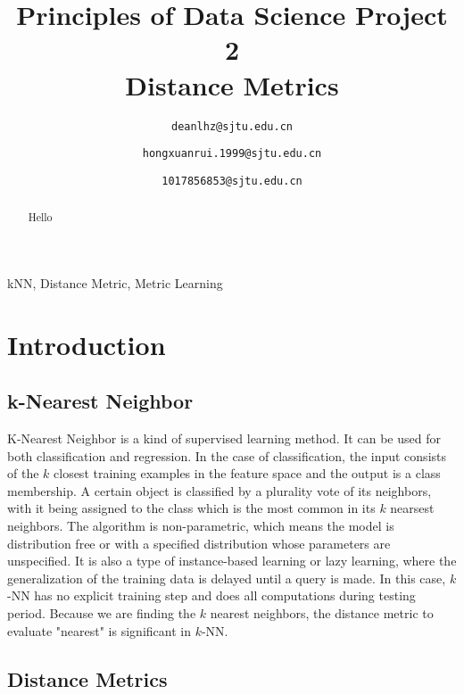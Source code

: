 \documentclass[conference]{IEEEtran}
\begin{document}


\title{Principles of Data Science Project 2\\
Distance Metrics}

\author{
\texttt{deanlhz@sjtu.edu.cn}
\and
{}
\texttt{hongxuanrui.1999@sjtu.edu.cn}
\and
{}
\texttt{1017856853@sjtu.edu.cn}
}

\maketitle

\begin{abstract}
Hello
\end{abstract}

\begin{IEEEkeywords}
kNN, Distance Metric, Metric Learning
\end{IEEEkeywords}

\section{Introduction}
\subsection{k-Nearest Neighbor}
K-Nearest Neighbor is a kind of supervised learning method. It can be used for both classification and regression.
In the case of classification, the input consists of the $k$ closest training examples in the feature space and the output is a class membership.
A certain object is classified by a plurality vote of its neighbors, with it being assigned to the class which is the most common in its $k$ nearsest neighbors.
The algorithm is non-parametric\cite{knn}, which means the model is distribution free or with a specified distribution whose parameters are unspecified.
It is also a type of instance-based learning or lazy learning, where the generalization of the training data is delayed until a query is made. In this case, $k$-NN has no explicit 
training step and does all computations during testing period. Because we are finding the $k$ nearest neighbors, the distance metric to evaluate "nearest" is significant in $k$-NN.
\subsection{Distance Metrics}
\end{document}

